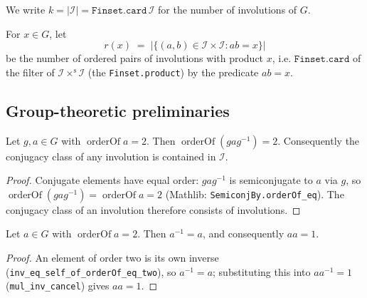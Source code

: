 \begin{definition}
    \label{def:k}
    \leanok
    We write $k = |\mathcal{I}| = \texttt{Finset.card}\,\mathcal{I}$ for the number
    of involutions of $G$.
\end{definition}

\begin{definition}
    \label{def:r}
    \leanok
    For $x \in G$, let
    \[
        r(x) \;=\; \bigl|\{(a,b) \in \mathcal{I} \times \mathcal{I} : ab = x\}\bigr|
    \]
    be the number of ordered pairs of involutions with product $x$, i.e.
    $\texttt{Finset.card}$ of the filter of $\mathcal{I} \times^{\mathrm s}
    \mathcal{I}$ (the \texttt{Finset.product}) by the predicate $ab = x$.
\end{definition}

\subsection{Group-theoretic preliminaries}

\begin{lemma}
    \label{lem:involution-conj}
    \leanok
    Let $g, a \in G$ with $\operatorname{orderOf} a = 2$. Then
    $\operatorname{orderOf}(g a g^{-1}) = 2$. Consequently the conjugacy class of
    any involution is contained in $\mathcal{I}$.
\end{lemma}
\begin{proof}
    Conjugate elements have equal order: $g a g^{-1}$ is semiconjugate to $a$ via
    $g$, so $\operatorname{orderOf}(g a g^{-1}) = \operatorname{orderOf} a = 2$
    (Mathlib: \texttt{SemiconjBy.orderOf\_eq}). The conjugacy class of an
    involution therefore consists of involutions.
\end{proof}

\begin{lemma}
    \label{lem:involution-inv}
    \leanok
    Let $a \in G$ with $\operatorname{orderOf} a = 2$. Then $a^{-1} = a$, and
    consequently $a a = 1$.
\end{lemma}
\begin{proof}
    An element of order two is its own inverse
    (\texttt{inv\_eq\_self\_of\_orderOf\_eq\_two}), so $a^{-1} = a$; substituting
    this into $a a^{-1} = 1$ (\texttt{mul\_inv\_cancel}) gives $a a = 1$.
\end{proof}

